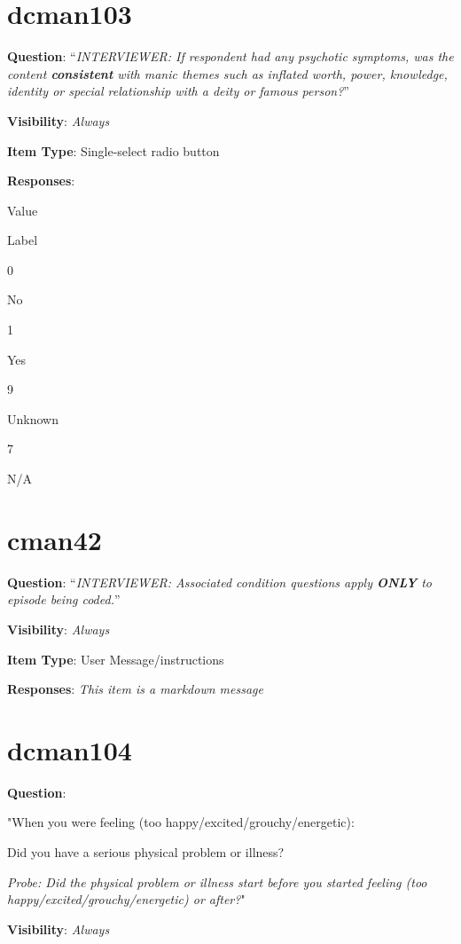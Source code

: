 \documentclass[]{book}
\begin{document}
\hypertarget{dcman103}{%
\section{dcman103}\label{dcman103}}

\textbf{Question}: ``\emph{INTERVIEWER: If respondent had any psychotic symptoms, was the content \textbf{consistent} with manic themes such as inflated worth, power, knowledge, identity or special relationship with a deity or famous person?}''

\textbf{Visibility}: \emph{Always}

\textbf{Item Type}: Single-select radio button

\textbf{Responses}:

Value

Label

0

No

1

Yes

9

Unknown

7

N/A

\hypertarget{cman42}{%
\section{cman42}\label{cman42}}

\textbf{Question}: ``\emph{INTERVIEWER: Associated condition questions apply \textbf{ONLY} to episode being coded.}''

\textbf{Visibility}: \emph{Always}

\textbf{Item Type}: User Message/instructions

\textbf{Responses}: \emph{This item is a markdown message}

\hypertarget{dcman104}{%
\section{dcman104}\label{dcman104}}

\textbf{Question}:

"When you were feeling (too happy/excited/grouchy/energetic):

Did you have a serious physical problem or illness?

\emph{Probe: Did the physical problem or illness start before you started feeling (too happy/excited/grouchy/energetic) or after?}"

\textbf{Visibility}: \emph{Always}
\end{document}

